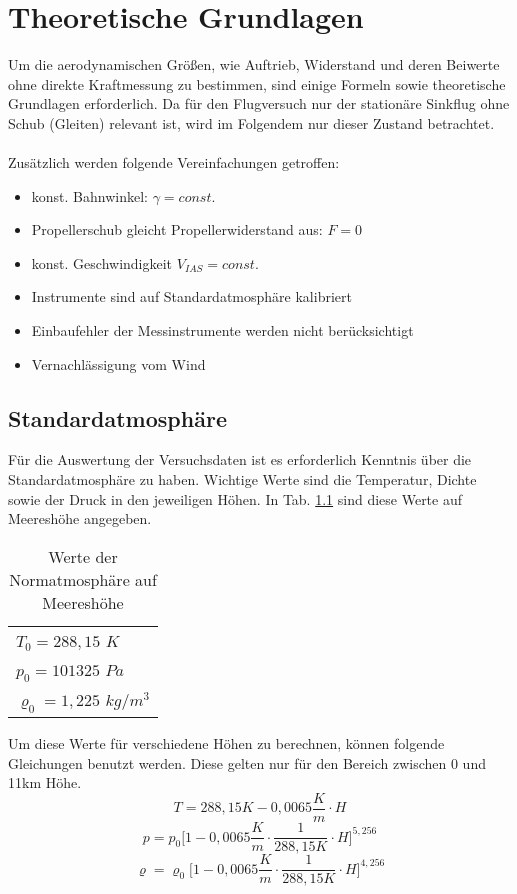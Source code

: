 \chapter{Theoretische Grundlagen}
\label{chapter:theorie}
Um die aerodynamischen Größen, wie Auftrieb, Widerstand und deren Beiwerte ohne direkte Kraftmessung zu bestimmen, sind einige Formeln sowie theoretische Grundlagen erforderlich. Da für den Flugversuch nur der stationäre Sinkflug ohne Schub (Gleiten) relevant ist, wird im Folgendem nur dieser Zustand betrachtet. \\ \\
Zusätzlich werden folgende Vereinfachungen getroffen:
\begin{itemize}
	\item konst. Bahnwinkel: $\gamma = const.$ 
	\item Propellerschub gleicht Propellerwiderstand aus: $F=0$
	\item konst. Geschwindigkeit $V_{IAS} = const.$
	\item Instrumente sind auf Standardatmosphäre kalibriert
	\item Einbaufehler der Messinstrumente werden nicht berücksichtigt
	\item Vernachlässigung vom Wind
\end{itemize}

\vspace{1cm}
\section{Standardatmosphäre}
Für die Auswertung der Versuchsdaten ist es erforderlich Kenntnis über die Standardatmosphäre zu haben. Wichtige Werte sind die Temperatur, Dichte sowie der Druck in den jeweiligen Höhen. In Tab. \ref{tab:atm_0} sind diese Werte auf Meereshöhe angegeben.
\begin{table}[h]
	\centering
	\begin{tabular}{l}
		\hline
		$T_0=288,15$ $K$ \\
		$p_0=101325$ $Pa$ \\
		$\varrho_0 = 1,225$ $kg/m^3$ \\
		\hline		
	\end{tabular}
	\caption{Werte der Normatmosphäre auf Meereshöhe} \label{tab:atm_0}
\end{table}
Um diese Werte für verschiedene Höhen zu berechnen, können folgende Gleichungen benutzt werden. Diese gelten nur für den Bereich zwischen 0 und 11km Höhe.
\begin{equation}\label{eq:T_INA}
T=288,15K - 0,0065 \frac{K}{m} \cdot H
\end{equation}
\begin{equation}\label{eq:p_INA}
p=p_0\biggl[1-0,0065 \frac{K}{m} \cdot \frac{1}{288,15K} \cdot H\biggr]^{5,256}
\end{equation}
\begin{equation}\label{eq:roh_INA}
\varrho = \varrho_0 \biggl[1-0,0065 \frac{K}{m} \cdot \frac{1}{288,15K} \cdot H\biggr]^{4,256}
\end{equation}
